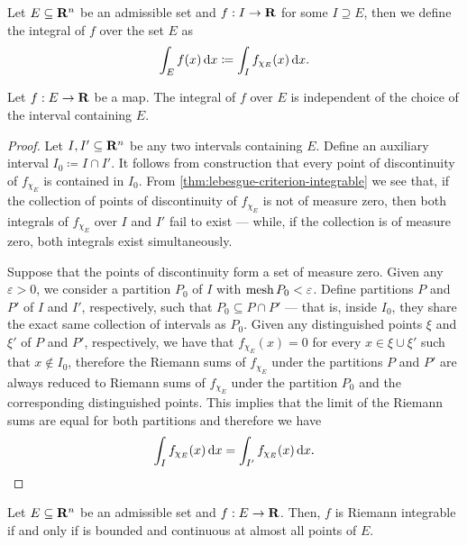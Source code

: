 \begin{definition}
    \label{def:riemann-integral-over-set}
    Let \(E \subseteq \mathbf{R}^n\) be an admissible set and \(f: I \to \mathbf{R}\) for some \(I
    \supseteq E\), then we define the integral of \(f\) over the set \(E\) as
    \[
        \int_E f(x)\, \mathrm{d} x \coloneq \int_I f_{\chi_E}(x)\, \mathrm{d} x.
    \]
\end{definition}

\begin{lemma}
    \label{lem:integral-well-defined}
    Let \(f: E \to \mathbf{R}\) be a map. The integral of \(f\) over \(E\) is independent of
    the choice of the interval containing \(E\).
\end{lemma}

\begin{proof}
    Let \(I, I' \subseteq \mathbf{R}^n\) be any two intervals containing \(E\). Define an
    auxiliary interval \(I_0 \coloneq I \cap I'\). It follows from construction that
    every point of discontinuity of \(f_{\chi_E}\) is contained in \(I_0\). From
    \cref{thm:lebesgue-criterion-integrable} we see that, if the collection of
    points of discontinuity of \(f_{\chi_E}\) is not of measure zero, then both
    integrals of \(f_{\chi_E}\) over \(I\) and \(I'\) fail to exist --- while, if
    the collection is of measure zero, both integrals exist simultaneously.

    Suppose that the points of discontinuity form a set of measure zero. Given any
    \(\varepsilon > 0\), we consider a partition \(P_0\) of \(I\) with \(\operatorname{mesh} P_0 <
    \varepsilon\). Define partitions \(P\) and \(P'\) of \(I\) and \(I'\),
    respectively, such that \(P_0 \subseteq P \cap P'\) --- that is, inside \(I_0\),
    they share the exact same collection of intervals as \(P_0\). Given any
    distinguished points \(\xi\) and \(\xi'\) of \(P\) and \(P'\), respectively,
    we have that \(f_{\chi_{E}}(x) = 0\) for every \(x \in \xi \cup \xi'\) such that
    \(x \not\in I_0\), therefore the Riemann sums of \(f_{\chi_E}\) under the
    partitions \(P\) and \(P'\) are always reduced to Riemann sums of \(f_{\chi_E}\)
    under the partition \(P_0\) and the corresponding distinguished points. This
    implies that the limit of the Riemann sums are equal for both partitions and
    therefore we have
    \[
        \int_I f_{\chi_E}(x)\, \mathrm{d} x = \int_{I'} f_{\chi_E}(x)\, \mathrm{d} x.
    \]
\end{proof}

\begin{corollary}
    \label{cor:condidion-riemann-integrable-admissible-set}
    Let \(E \subseteq \mathbf{R}^n\) be an admissible set and \(f: E \to \mathbf{R}\). Then, \(f\)
    is Riemann integrable if and only if is bounded and continuous at almost all
    points of \(E\).
\end{corollary}

